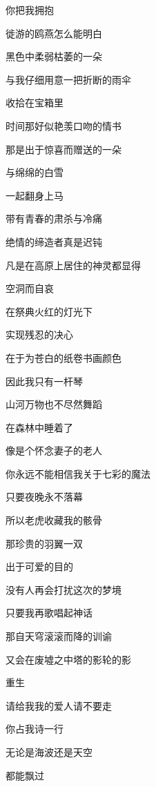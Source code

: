 \documentclass[UTF8]{article}
\begin{document}
\par 你把我拥抱
\par 徙游的鸥燕怎么能明白
\\[0.6cm]
\par 黑色中柔弱枯萎的一朵
\par 与我仔细用意一把折断的雨伞
\par 收拾在宝箱里
\par 时间那好似艳羡口吻的情书
\\[0.6cm]
\par 那是出于惊喜而赠送的一朵
\par 与绵绵的白雪
\par 一起翻身上马
\par 带有青春的肃杀与冷痛
\\[0.6cm]
\par 绝情的缔造者真是迟钝
\par 凡是在高原上居住的神灵都显得
\par 空洞而自哀
\par 在祭典火红的灯光下
\\[0.6cm]
\par 实现残忍的决心
\par 在于为苍白的纸卷书画颜色
\par 因此我只有一杆琴
\par 山河万物也不尽然舞蹈
\\[0.6cm]
\par 在森林中睡着了
\par 像是个怀念妻子的老人
\par 你永远不能相信我关于七彩的魔法
\par 只要夜晚永不落幕
\\[0.6cm]
\par 所以老虎收藏我的骸骨
\par 那珍贵的羽翼一双
\par 出于可爱的目的
\par 没有人再会打扰这次的梦境
\\[0.6cm]
\par 只要我再歌唱起神话
\par 那自天穹滚滚而降的训谕
\par 又会在废墟之中塔的影轮的影
\par 重生
\\[0.6cm]
\par 请给我我的爱人请不要走
\par 你占我诗一行
\par 无论是海波还是天空
\par 都能飘过
\\[0.6cm]
\end{document}
